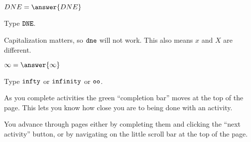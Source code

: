 \documentclass{ximera}
\begin{document}
\begin{problem}
  $DNE = \answer{DNE}$
  \begin{hint}
    Type $\verb|DNE|$.
  \end{hint}
  \begin{feedback}
    Capitalization matters, so $\verb!dne!$ will not work.  This also
    means $x$ and $X$ are different.
  \end{feedback}
\end{problem}

\begin{problem}
  $\infty = \answer{\infty}$
  \begin{hint}
    Type $\verb|infty|$ or $\verb|infinity|$ or $\verb|oo|$.
  \end{hint}
\end{problem}

As you complete activities the green ``completion bar'' moves at the
top of the page.  This lets you know how close you are to being done
with an activity.

You advance through pages either by completing them and clicking the
``next activity'' button, or by navigating on the little scroll bar at
the top of the page.
 
\end{document}
